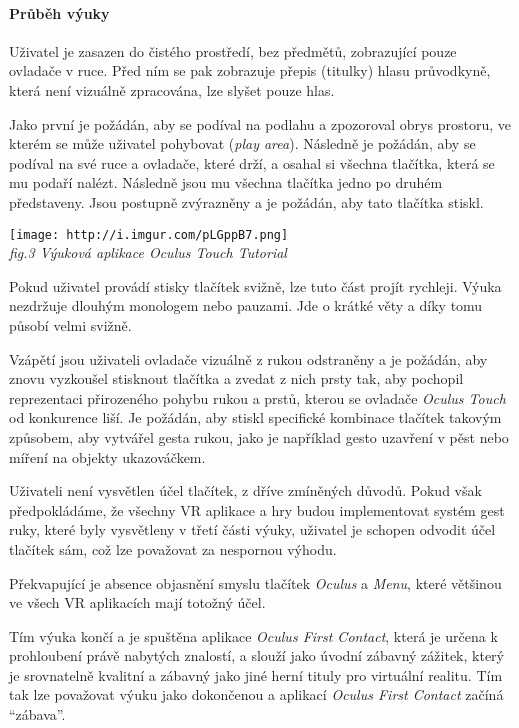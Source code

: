 \paragraph{Průběh výuky}\label{prux16fbux11bh-vuxfduky-1}

Uživatel je zasazen do čistého prostředí, bez předmětů, zobrazující
pouze ovladače v ruce. Před ním se pak zobrazuje přepis (titulky) hlasu
průvodkyně, která není vizuálně zpracována, lze slyšet pouze hlas.

Jako první je požádán, aby se podíval na podlahu a zpozoroval obrys
prostoru, ve kterém se může uživatel pohybovat (\emph{play area}).
Následně je požádán, aby se podíval na své ruce a ovladače, které drží,
a osahal si všechna tlačítka, která se mu podaří nalézt. Následně jsou
mu všechna tlačítka jedno po druhém představeny. Jsou postupně
zvýrazněny a je požádán, aby tato tlačítka stiskl.

\texttt{[image: http://i.imgur.com/pLGppB7.png]}\\
\emph{fig.3 Výuková aplikace Oculus Touch Tutorial}

Pokud uživatel provádí stisky tlačítek svižně, lze tuto část projít
rychleji. Výuka nezdržuje dlouhým monologem nebo pauzami. Jde o krátké
věty a díky tomu působí velmi svižně.

Vzápětí jsou uživateli ovladače vizuálně z rukou odstraněny a je
požádán, aby znovu vyzkoušel stisknout tlačítka a zvedat z nich prsty
tak, aby pochopil reprezentaci přirozeného pohybu rukou a prstů, kterou
se ovladače \emph{Oculus Touch} od konkurence liší. Je požádán, aby
stiskl specifické kombinace tlačítek takovým způsobem, aby vytvářel
gesta rukou, jako je například gesto uzavření v pěst nebo míření na
objekty ukazováčkem.

Uživateli není vysvětlen účel tlačítek, z dříve zmíněných důvodů. Pokud
však předpokládáme, že všechny VR aplikace a hry budou implementovat
systém gest ruky, které byly vysvětleny v třetí části výuky, uživatel je
schopen odvodit účel tlačítek sám, což lze považovat za nespornou
výhodu.

Překvapující je absence objasnění smyslu tlačítek \emph{Oculus} a
\emph{Menu}, které většinou ve všech VR aplikacích mají totožný účel.

Tím výuka končí a je spuštěna aplikace \emph{Oculus First Contact},
která je určena k prohloubení právě nabytých znalostí, a slouží jako
úvodní zábavný zážitek, který je srovnatelně kvalitní a zábavný jako
jiné herní tituly pro virtuální realitu. Tím tak lze považovat výuku
jako dokončenou a aplikací \emph{Oculus First Contact} začíná
``zábava''.

